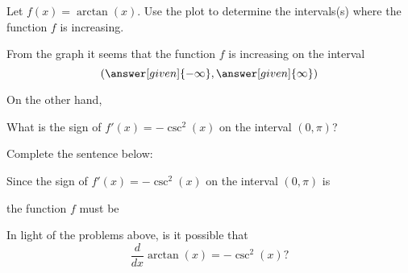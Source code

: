 \documentclass{ximera}
\begin{document}
\begin{problem}
\author{Nela Lakos}
  Let $f(x) = \arctan(x)$. Use the plot  to determine the  intervals(s) where the function $f$ is increasing.
  
From the graph it seems that the function $f$ is increasing on the interval
  \[
 \left(\answer[given]{-\infty},\answer[given]{\infty}\right)
  \]
\end{problem}




On the other hand,

\begin{problem}
 What is the sign of $f'(x)= - \csc^2 (x)$ on the interval $(0,\pi)$?
 \begin{problem}
   \begin{multipleChoice}
   \end{multipleChoice}
 \end{problem}
\end{problem}


\begin{problem}
Complete the sentence below:


 Since the sign of $f'(x)= - \csc^2 (x)$ on the interval $(0,\pi)$ is
 \begin{multipleChoice}
\end{multipleChoice}
the function $f$ must be
\begin{multipleChoice}
\end{multipleChoice}
\end{problem}

\begin{problem}

In light of the problems above, is it possible that
\[
\frac{d}{dx} \arctan(x) = -\csc^2(x)?
\]
\begin{multipleChoice}
\end{multipleChoice}
\end{problem}
\end{document}

